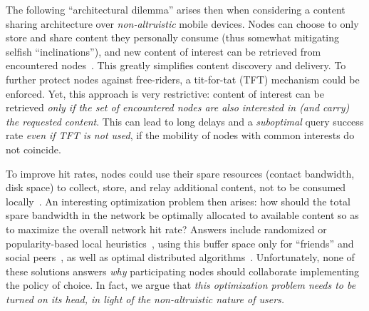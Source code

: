 The following ``architectural dilemma'' arises then when considering a content sharing architecture over \emph{non-altruistic} mobile devices. Nodes can choose to only store and share content they personally consume (thus somewhat mitigating selfish ``inclinations''), and new content of interest can be retrieved from encountered nodes~\cite{podnet07}. This greatly simplifies content discovery and delivery. To further protect nodes against free-riders, a tit-for-tat (TFT) mechanism could be enforced. Yet, this approach is very restrictive: content of interest can be retrieved \emph{only if the set of encountered nodes are also interested in (and carry) the requested content}.
This can lead to long delays and a \emph{suboptimal} query success rate \emph{even if TFT is not used}, if the mobility of nodes with common interests do not coincide.

To improve hit rates, nodes could use their spare resources (contact bandwidth, disk space) to collect, store, and relay additional content, not to be consumed locally~\cite{ContentPlace, SocialCast, OptimalChannelChoice, SocialCast, Boldrini:2008:MDD}. An interesting optimization problem then arises: how should the total spare bandwidth in the network be optimally allocated to available content so as to maximize the overall network hit rate? Answers include randomized or popularity-based local heuristics~\cite{May07wirelessopportunistic}, using this buffer space only for ``friends'' and social peers~\cite{ContentPlace, SocialCast, Boldrini:2008:MDD}, as well as optimal distributed algorithms~\cite{OptimalChannelChoice}. Unfortunately, none of these solutions answers \emph{why} participating nodes should collaborate implementing the policy of choice. In fact, we argue that \emph{this optimization problem needs to be turned on its head, in light of the non-altruistic nature of users.}


